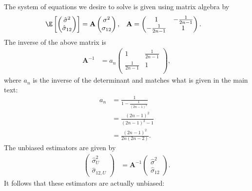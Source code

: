\documentclass[11pt]{article}
\begin{document}
The system of equations we desire to solve is given using matrix algebra by
\begin{align*}
  \E \left[
  \begin{pmatrix}
    \hat{\sigma}^2 \\
    \hat{\sigma}_{12}
  \end{pmatrix}
  \right]
  &=
    \mathbf{A}
    \begin{pmatrix}
      \sigma^2 \\
      \sigma_{12}
    \end{pmatrix}
    ,
  &
    \mathbf{A}
  &=
    \begin{pmatrix}
      1 & - \frac{1}{2n - 1} \\
      - \frac{1}{2n-1} & 1 \\
    \end{pmatrix}
    .
\end{align*}
The inverse of the above matrix is
\begin{align*}
  \mathbf{A}^{-1}
  &=
    a_n
    \begin{pmatrix}
      1 & \frac{1}{2n - 1} \\
      \frac{1}{2n-1} & 1 \\
    \end{pmatrix}
    ,
\end{align*}
where $a_n$ is the inverse of the determinant and matches what is given in the main text:
\begin{align*}
  a_n
  &=
    \frac{1}{1 - \frac{1}{(2n - 1)^2}}
  \\
  &=
    \frac{(2n - 1)^2}{(2n - 1)^2 - 1}
  \\
  &=
    \frac{(2n - 1)^2}{2n(2n - 2)}
    .
\end{align*}
The unbiased estimators are given by
\begin{align*}
  \begin{pmatrix}
    \hat{\sigma}^2_U \\
    \hat{\sigma}_{12,U}
  \end{pmatrix}
  &=
    \mathbf{A}^{-1}
    \begin{pmatrix}
      \hat{\sigma}^2 \\
      \hat{\sigma}_{12}
    \end{pmatrix}
    .
\end{align*}
It follows that these estimators are actually unbiased:
\end{document}
